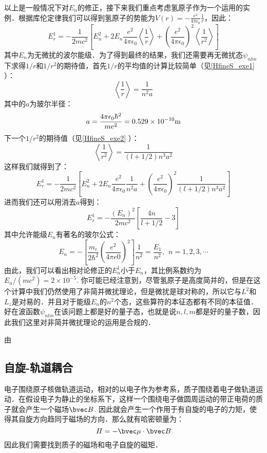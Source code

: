 以上是一般情况下对$E_n$的修正，接下来我们重点考虑氢原子作为一个运用的实例．根据库伦定律我们可以得到氢原子的势能为$V(r)=-\frac{e^2}{4\pi\epsilon_0}\frac{1}{r}$，因此：
\begin{equation}
E_r^1=-\frac{1}{2mc^2}\left[E_n^2+2E_n\frac{e^2}{4\pi\epsilon_0}\left\langle \frac{1}{r}\right\rangle+\left(\frac{e^2}{4\pi\epsilon_0}\right)^2\left\langle \frac{1}{r^2}\right\rangle\right]
\end{equation}
其中$E_n$为无微扰的波尔能级．为了得到最终的结果，我们还需要再无微扰态$\psi_{nlm}$下求得$1/r$和$1/r^2$的期待值，首先$1/r$的平均值的计算比较简单（见\autoref{HfineS_exe1} ）：
\begin{equation}
\left\langle\frac{1}{r}\right\rangle = \frac{1}{n^2a}
\end{equation}
其中的$a$为玻尔半径：
\begin{equation}
a=\frac{4\pi\epsilon_0\hbar^2}{me^2}=0.529\times 10^{-10}\rm{m}
\end{equation}
下一个$1/r^2$的期待值（见\autoref{HfineS_exe2} ）：
\begin{equation}
\left\langle \frac{1}{r^2}\right\rangle = \frac{1}{(l+1/2)n^3a^2}
\end{equation}
这样我们就得到了：
\begin{equation}
E_r^1=-\frac{1}{2mc^2}\left[E_n^2+2E_n\frac{e^2}{4\pi\epsilon_0}\frac{1}{n^2a}+\left(\frac{e^2}{4\pi\epsilon_0}\right)^2\frac{1}{(l+1/2)n^3a^2}\right]
\end{equation}
进而我们还可以用消去$a$得到：
\begin{equation}
E_r^1=-\frac{(E_n)^2}{2mc^2}\left[\frac{4n}{l+1/2}-3\right]
\end{equation}
其中允许能级$E_n$有著名的玻尔公式：
\begin{equation}
E_{n} =-\left[\frac {m_e}{2\hbar^{2}} \left(\frac {e^ {2}}{4\pi e0}\right)^ {2}\right]  \frac {1}{n^ {2}}  =  \frac {E_ {1}}{n^ {2}}, \ \  n=1,2,3, \cdots 
\end{equation}
由此，我们可以看出相对论修正的$E^1_n$小于$E_n$，其比例系数约为$E_n/(mc^2)=2\times 10^{-5}$.
你可能已经注意到，尽管氢原子是高度简并的，但是在这个计算中我们仍然使用了非简并微扰理论，但是微扰是球对称的，所以它与$L^2$和$L_z$是对易的．并且对于能级$E_n$的$n^2$个态，这些算符的本征态都有不同的本征值．好在波函数$\psi_{nlm}$在该问题上都是好的量子态，也就是说$n,l,m$都是好的量子数，因此我们这里对非简并微扰理论的运用是合规的．

由
\subsection{自旋-轨道耦合}
电子围绕原子核做轨道运动，相对的以电子作为参考系，质子围绕着电子做轨道运动．在假设电子为静止的坐标系下，这样一个围绕电子做圆周运动的带正电荷的质子就会产生一个磁场$\bvec B$. 因此就会产生一个作用于有自旋的电子的力矩，使得其自旋方向趋同于磁场的方向．那么就有哈密顿量为：
\begin{equation}
H=-\bvec\mu \cdot \bvec B
\end{equation}
因此我们需要找到质子的磁场和电子自旋的磁矩．

